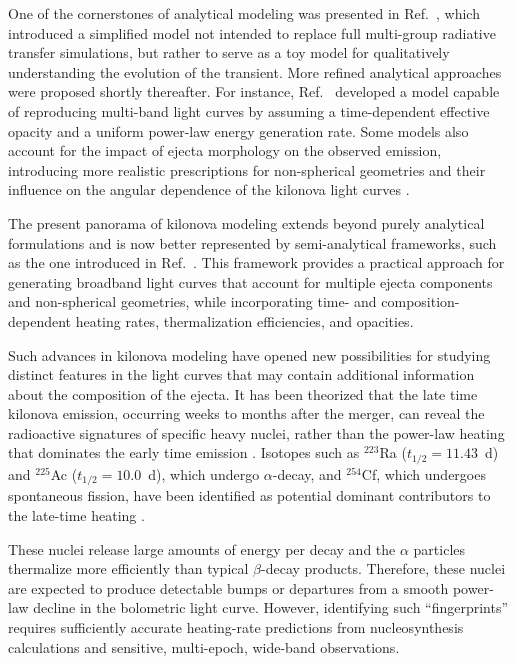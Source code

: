 One of the cornerstones of analytical modeling was presented in Ref.~\cite{metzger_kilonovae_2017}, which introduced a simplified model not intended to replace full multi-group radiative transfer simulations, but rather to serve as a toy model for qualitatively understanding the evolution of the transient.
More refined analytical approaches were proposed shortly thereafter. For instance, Ref.~\cite{waxman_constraints_2018} developed a model capable of reproducing multi-band light curves by assuming a time-dependent effective opacity and a uniform power-law energy generation rate.
Some models also account for the impact of ejecta morphology on the observed emission, introducing more realistic prescriptions for non-spherical geometries and their influence on the angular dependence of the kilonova light curves \cite{wollaeger_impact_2018}.

The present panorama of kilonova modeling extends beyond purely analytical formulations and is now better represented by semi-analytical frameworks, such as the one introduced in Ref.~\cite{ricigliano_xkn_2024}. This framework provides a practical approach for generating broadband light curves that account for multiple ejecta components and non-spherical geometries, while incorporating time- and composition-dependent heating rates, thermalization efficiencies, and opacities. 

Such advances in kilonova modeling have opened new possibilities for studying distinct features in the light curves that may contain additional information about the composition of the ejecta.
It has been theorized that the late time kilonova emission, occurring weeks to months after the merger, can reveal the radioactive signatures of specific heavy nuclei, rather than the power-law heating that dominates the early time emission \cite{wu_fingerprints_2019}.
Isotopes such as $^{223}$Ra ($t_{1/2}=11.43$~d) and $^{225}$Ac ($t_{1/2}=10.0$~d), which undergo $\alpha$-decay, and $^{254}$Cf, which undergoes spontaneous fission, have been identified as potential dominant contributors to the late-time heating \cite{chen_radioactive_2023}.

These nuclei release large amounts of energy per decay and the $\alpha$ particles thermalize more efficiently than typical $\beta$-decay products.
Therefore, these nuclei are expected to produce detectable bumps or departures from a smooth power-law decline in the bolometric light curve.
However, identifying such “fingerprints” requires sufficiently accurate heating-rate predictions from nucleosynthesis calculations and sensitive, multi-epoch, wide-band observations.

